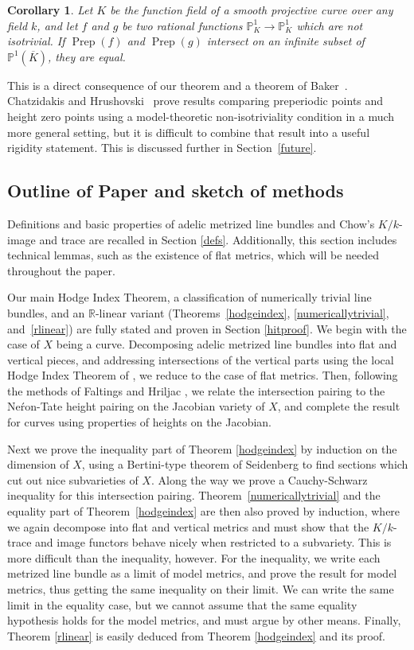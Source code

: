 \documentclass[times, doublespace]{amsart}
\numberwithin{equation}{section}
\theoremstyle{plain}
\newtheorem{cor}[equation]{Corollary}
\theoremstyle{definition}
\DeclareMathOperator{\Prep}{Prep}
\newcommand{\R}{\mathbb{R}}
\renewcommand{\P}{\mathbb{P}}
\begin{document}
\begin{cor}\label{bakercor}
Let $K$ be the function field of a smooth projective curve over any field $k$, and let $f$ and $g$ be two rational functions $\P^1_K\to\P^1_K$ which are not isotrivial. If $\Prep(f)$ and $\Prep(g)$ intersect on an infinite subset of $\P^1(\overline K)$, they are equal.
\end{cor}

This is a direct consequence of our theorem and a theorem of Baker~\cite{bakerisotrivial}. Chatzidakis and Hrushovski~\cite{chatzidakis1,chatzidakis2} prove results comparing preperiodic points and height zero points using a model-theoretic non-isotriviality condition in a much more general setting, but it is difficult to combine that result into a useful rigidity statement. This is discussed further in Section~\ref{future}.




\subsection{Outline of Paper and sketch of methods}
Definitions and basic properties of adelic metrized line bundles and Chow's $K/k$-image and trace are recalled in Section \ref{defs}. Additionally, this section includes technical lemmas, such as the existence of flat metrics, which will be needed throughout the paper. 

Our main Hodge Index Theorem, a classification of numerically trivial line bundles, and an $\R$-linear variant (Theorems~\ref{hodgeindex}, \ref{numericallytrivial}, and~\ref{rlinear}) are fully stated and proven in Section \ref{hitproof}. We begin with the case of $X$ being a curve. Decomposing adelic metrized line bundles into flat and vertical pieces, and addressing intersections of the vertical parts using the local Hodge Index Theorem of \cite[Theorem 2.1]{yz}, we reduce to the case of flat metrics. Then, following the methods of Faltings \cite{faltings} and Hriljac \cite{hriljac}, we relate the intersection pairing to the Ne\'ron-Tate height pairing on the Jacobian variety of $X$, and complete the result for curves using properties of heights on the Jacobian.

Next we prove the inequality part of Theorem \ref{hodgeindex} by induction on the dimension of $X$, using a Bertini-type theorem of Seidenberg \cite{Seidenberg} to find sections which cut out nice subvarieties of $X$. Along the way we prove a Cauchy-Schwarz inequality for this intersection pairing. Theorem~\ref{numericallytrivial} and the equality part of Theorem~\ref{hodgeindex} are then also proved by induction, where we again decompose into flat and vertical metrics and must show that the $K/k$-trace and image functors behave nicely when restricted to a subvariety. This is more difficult than the inequality, however. For the inequality, we write each metrized line bundle as a limit of model metrics, and prove the result for model metrics, thus getting the same inequality on their limit. We can write the same limit in the equality case, but we cannot assume that the same equality hypothesis holds for the model metrics, and must argue by other means. Finally, Theorem \ref{rlinear} is easily deduced from Theorem \ref{hodgeindex} and its proof.
\end{document}
